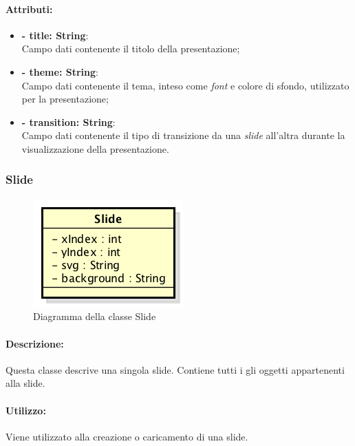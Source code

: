 	\paragraph{Attributi:}
	\begin{itemize}
		\item \textbf{- title: String}:\\
			Campo dati contenente il titolo della presentazione;
		\item \textbf{- theme: String}:\\
			Campo dati contenente il tema, inteso come \textit{\gls{font}} e colore di sfondo, utilizzato per la presentazione;
		\item \textbf{- transition: String}:\\
			Campo dati contenente il tipo di transizione da una \textit{\gls{slide}} all'altra durante la visualizzazione della presentazione.
	\end{itemize}


\newpage


\subsubsection{Slide}

	\begin{figure}[h]
		\centering
		\includegraphics[width=0.4\linewidth]{img/premi_front_end_model_slide}
		\caption[Diagramma della classe \gls{Slide}]{Diagramma della classe Slide}
		\label{fig:back_end_premi_model_slide}
	\end{figure}
	
	
	\paragraph{Descrizione:}
	Questa classe descrive una singola \gls{slide}. Contiene tutti i gli oggetti appartenenti alla \gls{slide}.
	
	\paragraph{Utilizzo:}
	Viene utilizzato alla creazione o caricamento di una \gls{slide}.
	
